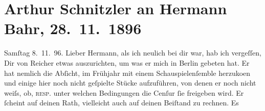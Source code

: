 

         
         \newcommand{\erwaehntePersonen}{Personen: Hermann Bahr, Max Halbe, Gerhart Hauptmann, Emanuel Reicher}
         \newcommand{\erwaehnteInstitutionen}{}
         \newcommand{\erwaehnteOrte}{Orte: Berlin, Wien, Österreich}
         \newcommand{\erwaehnteWerke}{Werke: Die Weber. Schauspiel aus den vierziger Jahren, Jugend. Ein Liebesdrama}
               \section[Arthur Schnitzler an Hermann Bahr, 28. 11. 1896]{ Arthur Schnitzler an Hermann Bahr, 28. 11. 1896}\nopagebreak{}\rehead{ }\begin{ledgroupsized}[t]{13cm}\normalsize\beginnumbering \toendnotes[C]{\smallbreak\pagebreak[2]} 
\toendnotes[C]{\smallbreak}\pstart
           \raggedleft{}{\pb}Samſtag 8. 11. 96.\pend
           \pstart{}Lieber Hermann,\pend\pstart
           als ich neulich bei dir war, hab ich vergeſſen, Dir von Reicher etwas auszurichten, um was er mich in Berlin gebeten hat. Er hat nemlich die {\pb}Abſicht, im Frühjahr
               mit einem Schauspielenſemble herzuko{\geminationm}en und einige hier
               noch nicht geſpielte Stücke aufzuführen, von denen er noch nicht weiſs, ob, \textsc{resp}. unter welchen Bedingungen die {\pb}Cenſur ſie freigeben
               wird. Er ſcheint auf deinen Rath, vielleicht auch auf deinen Beiſtand zu rechnen. Es

\end{ledgroupsized}
